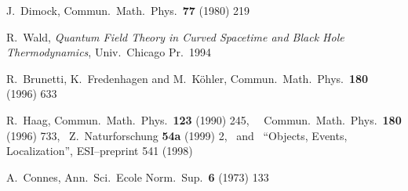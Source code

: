 \begin{thebibliography}{99}
  J.\ Dimock, Commun.\ Math.\ Phys.\ {\bf 77} (1980) 219 

 R.\ Wald, 
{\it Quantum Field Theory in Curved Spacetime and Black Hole
Thermodynamics},  Univ.\ Chicago Pr.\ 1994

R.\ Brunetti, K.\ Fredenhagen and M.\ K\"ohler, 
Commun.\ Math.\ Phys.\ {\bf 180} (1996) 633

 R.\ Haag, Commun.\ Math.\ Phys.\ {\bf  123} (1990) 245, \
\ Commun.\ Math.\ Phys.\ {\bf 180} (1996) 733, \ 
Z.\ Naturforschung {\bf 54a} (1999) 2, \ and \ 
``Objects, Events, Localization'', 
ESI--preprint 541 (1998)

 A.\ Connes, 
Ann.\ Sci.\ Ecole Norm.\ Sup.\ {\bf 6} (1973) 133


\end{thebibliography}


